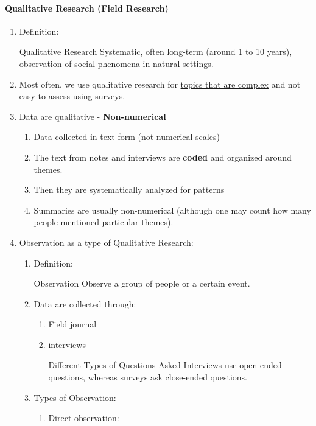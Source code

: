 \documentclass[12pt,a4paper]{article}
\begin{document}
\paragraph{Qualitative Research (Field Research)}
\begin{enumerate}
	\item Definition: 
	\begin{df}{Qualitative Research}
		Systematic, often long-term (around 1 to 10 years), observation of social phenomena in natural settings.
	\end{df}
	\item Most often, we use qualitative research for \underline{topics that are complex} and not easy to assess using surveys. 
	\item Data are qualitative - \textbf{Non-numerical}
	\begin{enumerate}
		\item Data collected in text form (not numerical scales)
		\item The text from notes and interviews are \textbf{coded} and organized around themes.
		\item Then they are systematically analyzed for patterns
		\item Summaries are usually non-numerical (although one may count how many people mentioned particular themes).
	\end{enumerate}
	\item Observation as a type of Qualitative Research: 
	\begin{enumerate}
		\item Definition: 
		\begin{df}{Observation}
			Observe a group of people or a certain event.
		\end{df}
		\item Data are collected through: 
		\begin{enumerate}
			\item Field journal
			\item interviews
			\begin{ext}{Different Types of Questions Asked}
				Interviews use open-ended questions, whereas surveys ask close-ended questions.
			\end{ext}
		\end{enumerate}
		\item Types of Observation: 
		\begin{enumerate}
			\item Direct observation: 
			\begin{enumerate}

\end{enumerate}
\end{enumerate}
\end{enumerate}
\end{enumerate}
\end{document}
